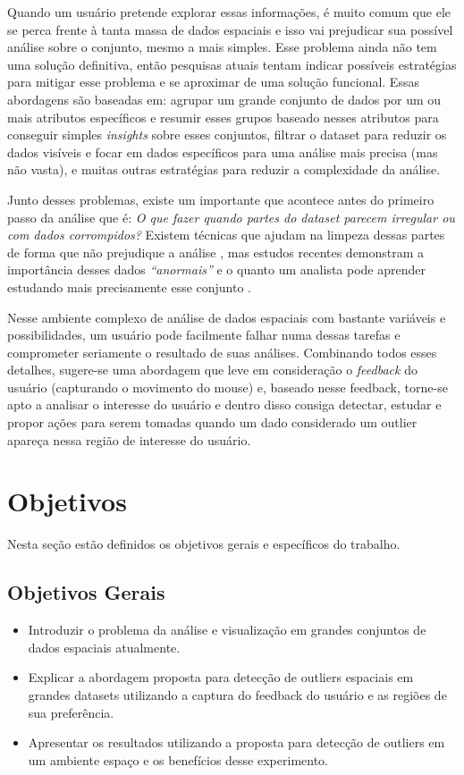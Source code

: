 Quando um usuário pretende explorar essas informações, é muito comum que ele se perca frente à tanta massa de dados espaciais e isso vai prejudicar sua possível análise sobre o conjunto, mesmo a mais simples. Esse problema ainda não tem uma solução definitiva, então pesquisas atuais tentam indicar possíveis estratégias para mitigar esse problema e se aproximar de uma solução funcional. Essas abordagens são baseadas em: agrupar um grande conjunto de dados por um ou mais atributos específicos e resumir esses grupos baseado nesses atributos para conseguir simples \textit{insights} sobre esses conjuntos, filtrar o dataset para reduzir os dados visíveis e focar em dados específicos para uma análise mais precisa (mas não vasta), e muitas outras estratégias para reduzir a complexidade da análise.

Junto desses problemas, existe um importante que acontece antes do primeiro passo da análise que é: \textit{O que fazer quando partes do dataset parecem irregular ou com dados corrompidos?} Existem técnicas que ajudam na limpeza dessas partes de forma que não prejudique a análise \cite{10.1007/978-3-319-11116-2_2}, mas estudos recentes demonstram a importância desses dados \textit{``anormais''} e o quanto um analista pode aprender estudando mais precisamente esse conjunto \cite{DBLP:journals/debu/FreireCVZ16}.

Nesse ambiente complexo de análise de dados espaciais com bastante variáveis e possibilidades, um usuário pode facilmente falhar numa dessas tarefas e comprometer seriamente o resultado de suas análises. Combinando todos esses detalhes, sugere-se uma abordagem que leve em consideração o \textit{feedback} do usuário (capturando o movimento do mouse) e, baseado nesse feedback, torne-se apto a analisar o interesse do usuário e dentro disso consiga detectar, estudar e propor ações para serem tomadas quando um dado considerado um outlier apareça nessa região de interesse do usuário.

\section{Objetivos}

Nesta seção estão definidos os objetivos gerais e específicos do trabalho.

\subsection{Objetivos Gerais}

\begin{itemize}
	\item
	      Introduzir o problema da análise e visualização em grandes conjuntos de dados espaciais atualmente.
	\item
	      Explicar a abordagem proposta para detecção de outliers espaciais em grandes datasets utilizando a captura do feedback do usuário e as regiões de sua preferência.
	\item
	      Apresentar os resultados utilizando a proposta para detecção de outliers em um ambiente espaço e os benefícios desse experimento.

\end{itemize}

